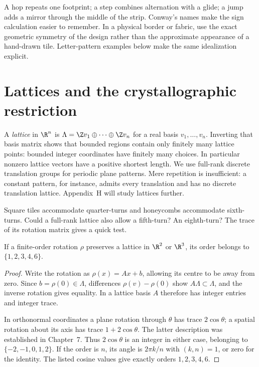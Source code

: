 A hop repeats one footprint; a step combines alternation with a glide; a jump adds a mirror through the middle of the strip. Conway's names make the sign calculation easier to remember. In a physical border or fabric, use the exact geometric symmetry of the design rather than the approximate appearance of a hand-drawn tile. Letter-pattern examples below make the same idealization explicit.

\section{Lattices and the crystallographic restriction}

A \emph{lattice} in $\R^n$ is $\Lambda=\Z v_1\oplus\cdots\oplus\Z v_n$ for a real basis $v_1,\ldots,v_n$. Inverting that basis matrix shows that bounded regions contain only finitely many lattice points: bounded integer coordinates have finitely many choices. In particular nonzero lattice vectors have a positive shortest length. We use full-rank discrete translation groups for periodic plane patterns. Mere repetition is insufficient: a constant pattern, for instance, admits every translation and has no discrete translation lattice. Appendix~H will study lattices further.

\begin{think}
Square tiles accommodate quarter-turns and honeycombs accommodate sixth-turns. Could a full-rank lattice also allow a fifth-turn? An eighth-turn? The trace of its rotation matrix gives a quick test.
\end{think}

\begin{theorem}\label{geometry:thm:crystallographic}
If a finite-order rotation $\rho$ preserves a lattice in $\R^2$ or $\R^3$, its order belongs to $\{1,2,3,4,6\}$.
\end{theorem}
\begin{proof}
Write the rotation as $\rho(x)=Ax+b$, allowing its centre to be away from zero. Since $b=\rho(0)\in\Lambda$, differences $\rho(v)-\rho(0)$ show $A\Lambda\subset\Lambda$, and the inverse rotation gives equality. In a lattice basis $A$ therefore has integer entries and integer trace.

In orthonormal coordinates a plane rotation through $\theta$ has trace $2\cos\theta$; a spatial rotation about its axis has trace $1+2\cos\theta$. The latter description was established in Chapter~7. Thus $2\cos\theta$ is an integer in either case, belonging to $\{-2,-1,0,1,2\}$. If the order is $n$, its angle is $2\pi k/n$ with $(k,n)=1$, or zero for the identity. The listed cosine values give exactly orders $1,2,3,4,6$.
\end{proof}

